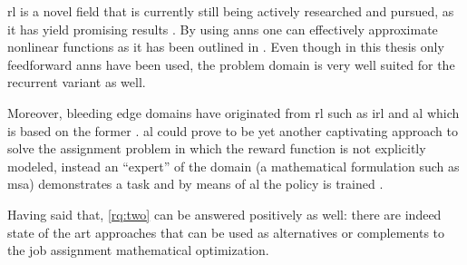 \gls{rl} is a novel field that is currently still being actively researched and pursued, as it has yield promising results \citep{Mnih2015,Silver2016}. By using \glspl{ann} one can effectively approximate nonlinear functions as it has been outlined in . Even though in this thesis only feedforward \glspl{ann} have been used, the problem domain is very well suited for the recurrent variant as well.

Moreover, bleeding edge domains have originated from \gls{rl} such as \gls{irl} \citep{Ng2000} and \gls{al} which is based on the former \citep{Abbeel2004}. \gls{al} could prove to be yet another captivating approach to solve the assignment problem in which the reward function is not explicitly modeled, instead an ``expert'' of the domain (\ie a mathematical formulation such as \gls{msa}) demonstrates a task and by means of \gls{al} the policy is trained \citep{Abbeel2004}.

Having said that, \ref{rq:two} can be answered positively as well: there are indeed state of the art approaches that can be used as alternatives or complements to the job assignment mathematical optimization. 